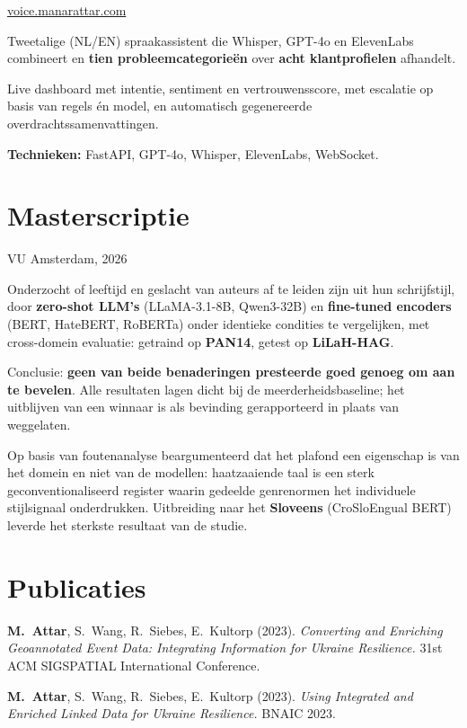 \documentclass[10pt]{article}
\newcommand{\project}[2]{\vspace{3pt}{\bfseries #1}\hfill{\footnotesize\color{gray}#2}\par\vspace{-1pt}}
\newcommand{\pskills}[1]{{\small\textbf{Technieken:} #1}\par}
\begin{document}
\project{TelecomNL Voice AI Assistant}{\href{https://voice.manarattar.com}{voice.manarattar.com}}
\begin{tights}
  \item Tweetalige (NL/EN) spraakassistent die Whisper, GPT-4o en ElevenLabs combineert en \textbf{tien probleemcategorieën} over \textbf{acht klantprofielen} afhandelt.
  \item Live dashboard met intentie, sentiment en vertrouwensscore, met escalatie op basis van regels én model, en automatisch gegenereerde overdrachtssamenvattingen.
\end{tights}
\pskills{FastAPI, GPT-4o, Whisper, ElevenLabs, WebSocket.}

\section*{Masterscriptie}
\project{Author Profiling van verspreiders van haatzaaiende taal: zero-shot LLM's versus fine-tuned encoders}{VU Amsterdam, 2026}
\begin{tights}
  \item Onderzocht of leeftijd en geslacht van auteurs af te leiden zijn uit hun schrijfstijl, door \textbf{zero-shot LLM's} (LLaMA-3.1-8B, Qwen3-32B) en \textbf{fine-tuned encoders} (BERT, HateBERT, RoBERTa) onder identieke condities te vergelijken, met cross-domein evaluatie: getraind op \textbf{PAN14}, getest op \textbf{LiLaH-HAG}.
  \item Conclusie: \textbf{geen van beide benaderingen presteerde goed genoeg om aan te bevelen}. Alle resultaten lagen dicht bij de meerderheidsbaseline; het uitblijven van een winnaar is als bevinding gerapporteerd in plaats van weggelaten.
  \item Op basis van foutenanalyse beargumenteerd dat het plafond een eigenschap is van het domein en niet van de modellen: haatzaaiende taal is een sterk geconventionaliseerd register waarin gedeelde genrenormen het individuele stijlsignaal onderdrukken. Uitbreiding naar het \textbf{Sloveens} (CroSloEngual BERT) leverde het sterkste resultaat van de studie.
\end{tights}

\section*{Publicaties}
{\small
\textbullet\; \textbf{M.\ Attar}, S.\ Wang, R.\ Siebes, E.\ Kultorp (2023). \textit{Converting and Enriching Geoannotated Event Data: Integrating Information for Ukraine Resilience.} 31st ACM SIGSPATIAL International Conference.\par\vspace{2pt}
\textbullet\; \textbf{M.\ Attar}, S.\ Wang, R.\ Siebes, E.\ Kultorp (2023). \textit{Using Integrated and Enriched Linked Data for Ukraine Resilience.} BNAIC 2023.
}
\end{document}
